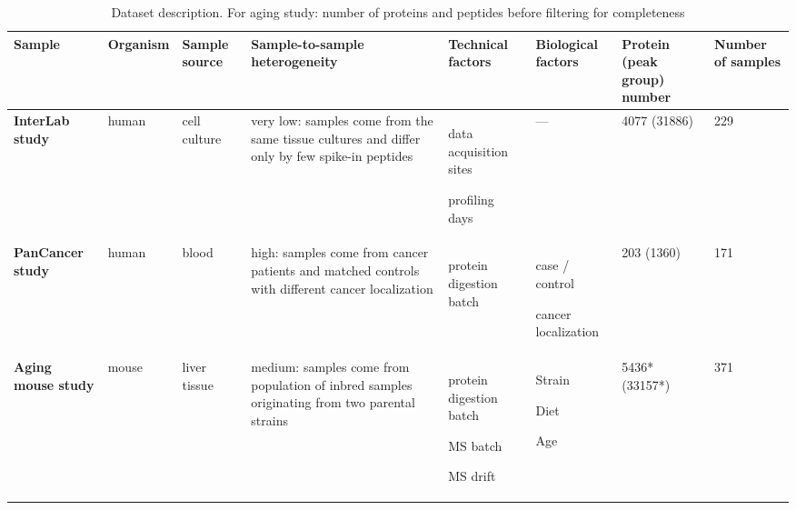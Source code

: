 \documentclass[num-refs]{wiley-article}
\newcommand{\squishlist}{%
	\begin{list}{-}%
		{\setlength{\itemsep}{0pt}
			\setlength{\parsep}{0pt}
			\setlength{\topsep}{0pt}
			\setlength{\partopsep}{0pt}
			\setlength{\leftmargin}{1em}
			\setlength{\labelwidth}{1em}
			\setlength{\labelsep}{0.5em}}}
\newcommand{\squishend}{\end{list}}
\begin{document}
\begin{landscape}
	\begin{table}
		\renewcommand*{\arraystretch}{1.8}
		\caption[Dataset description]{Dataset description. For aging study: number of proteins and peptides before filtering for completeness}
		\label{tab:batch_datasets}
		\small
		\begin{tabular}{|  m{1.75cm}|  m{1.15cm} |  >{\raggedright}m{1.5cm} | >{\raggedright}m{4.13cm} |  m{2.5cm} |  >{\raggedright}m{2.2cm} |  m{1.5cm} |  m{1.5cm} |}
			\hline
			\textbf{Sample} & \textbf{Organism} & \textbf{Sample source} & \textbf{Sample-to-sample heterogeneity} & \textbf{Technical factors} & \textbf{Biological factors} & \textbf{Protein (peak group) number} & \textbf{Number of samples} \\
			\hline
			\hline
			\textbf{InterLab study} & human & cell culture & very low: 
			samples come from the same tissue cultures and differ only by few spike-in peptides
			& \vspace*{1em}\squishlist
			\item data acquisition sites
			\item profiling days
			\squishend
			& --- & 4077
			(31886)
			& 229  \\
			\hline
			\textbf{PanCancer study} & human & blood & high: 
			samples come from cancer patients and matched controls with different cancer localization
			& \squishlist
			\item protein digestion batch
			\squishend
			& \squishlist
			\item case / control
			\item cancer localization
			\squishend
			& 203 (1360)
			& 171  \\
			\hline
			\textbf{Aging mouse study} & mouse & liver tissue & medium: 
			samples come from population of inbred samples originating from two parental strains
			&  \vspace*{1em}\squishlist
			\item protein digestion batch
			\item MS batch
			\item MS drift
			\squishend
			& \squishlist
			\item Strain
			\item Diet
			\item Age
			\squishend
			& 5436*
			(33157*)
			& 371  \\
			\hline
		\end{tabular}
	\end{table}
\end{landscape}
\end{document}
